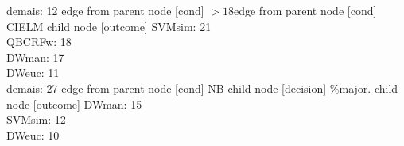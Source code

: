 {{{{%
demais: 12} edge from parent node [cond] {$>18$}}edge from parent node [cond] {CIELM}}
child {node [outcome] {
SVMsim: 21\\
QBCRFw: 18\\
DWman: 17\\
DWeuc: 11\\
demais: 27} edge from parent node [cond] {NB}}
child {node [decision] {\%major.}
child {node [outcome] {
DWman: 15\\
SVMsim: 12\\
DWeuc: 10\\
}}}}
